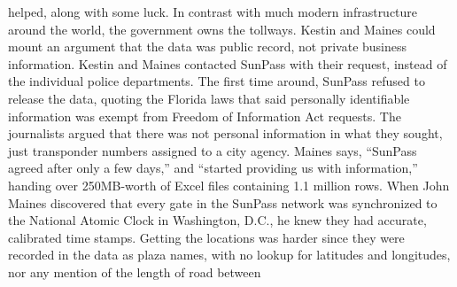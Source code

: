 helped, along with some luck. In contrast with much modern infrastructure
around the world, the government owns the tollways. Kestin and Maines
could mount an argument that the data was public record, not private business
information.
Kestin and Maines contacted SunPass with their request, instead of the
individual police departments. The first time around, SunPass refused to
release the data, quoting the Florida laws that said personally identifiable
information was exempt from Freedom of Information Act requests. The
journalists argued that there was not personal information in what they
sought, just transponder numbers assigned to a city agency.
Maines says, ``SunPass agreed after only a few days,'' and ``started providing
us with information,'' handing over 250MB-worth of Excel files containing
1.1 million rows.
When John Maines discovered that every gate in the SunPass network was
synchronized to the National Atomic Clock in Washington, D.C., he knew
they had accurate, calibrated time stamps. Getting the locations was harder
since they were recorded in the data as plaza names, with no lookup for
latitudes and longitudes, nor any mention of the length of road between

